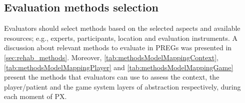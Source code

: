 \begin{table}[htb]
\caption{Aspects to evaluate the game system layer over time}
\label{tab:aspectsModelMappingGame}
\myfloatalign
{}
\end{table}

\subsection{Evaluation methods selection}
Evaluators should select methods based on the selected aspects and available resources; e.g., experts, participants, location and evaluation instruments. A discussion about relevant methods to evaluate in \acp{PREG} was presented in \autoref{sec:rehab_methods}. Moreover, \autoref{tab:methodsModelMappingContext}, \autoref{tab:methodsModelMappingPlayer} and \autoref{tab:methodsModelMappingGame} present the methods that evaluators can use to assess the context, the player/patient and the game system layers of abstraction respectively, during each moment of \ac{PX}.

